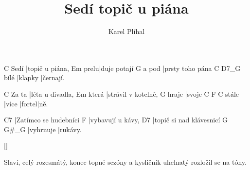 \documentclass{song}
\title{Sedí topič u piána}
\author{Karel Plíhal}
\begin{document}
     C
Sedí |topič u piána,
     Em
prelu|duje potají
      G
a pod |prsty toho pána
     C       D7_G
bílé |klapky |černají.
\endstrophe

\strophe
      C
Za ta |léta u divadla,
      Em
která |strávil v kotelně,
      G
hraje |svoje 
      C     F      C
stále |více |fortel|ně.
\endstrophe

\strophe
C7
|Zatímco se hudebníci
F
|vybavují u kávy,
D7
|topič si nad klávesnicí
G         G#_G
|vyhrnuje |rukávy.
\endstrophe

\ref{}

\strophe*
Slaví, celý rozesmátý,
konec topné sezóny
a kysličník uhelnatý
rozložil se na tóny.
\endstrophe
\end{document}

